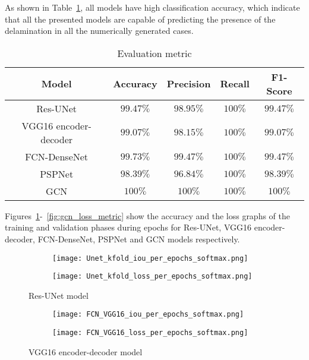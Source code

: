 As shown in Table~\ref{tab:evaluation_metric}, all models have high classification accuracy, which indicate that all the presented models are capable of predicting the presence of the delamination in all the numerically generated cases. 
\begin{table}[]
	\centering
	\caption{Evaluation metric}
	\label{tab:evaluation_metric}
	\resizebox{\textwidth}{!}
	{
		\begin{tabular}{ccccc} \hline
			Model& Accuracy & Precision & Recall & F1-Score \\ \hline
			Res-UNet & \(99.47\%\)  & \(98.95\%\) &  \(100\%\)  & \(99.47\%\)  \\ 
			VGG16 encoder-decoder & \(99.07\%\)  & \(98.15\%\) & \(100\%\) &  \(99.07\%\)\\ 
			FCN-DenseNet & \(99.73\%\)  & \(99.47\%\) & \(100\%\)  & \(99.47\%\) \\ 
			PSPNet & \(98.39\%\) & \(96.84\%\) & \(100\%\) & \(98.39\%\) \\ 
			GCN & \(100\%\) & \(100\%\) & \(100\%\) & \(100\%\) \\ \hline
		\end{tabular}
	}
\end{table}
Figures~\ref{fig:unet_accuracy_metric}-~\ref{fig:gcn_loss_metric} show the accuracy and the loss graphs of the training and validation phases during epochs for Res-UNet, VGG16 encoder-decoder, FCN-DenseNet, PSPNet and GCN models respectively.
\begin{figure} [!h]
	\centering
	\begin{subfigure}[b]{0.47\textwidth}
	 \centering		\texttt{[image: Unet\_kfold\_iou\_per\_epochs\_softmax.png]}	\caption{}
	 \label{fig:unet_accuracy_metric}
	\end{subfigure}
	\hfill	
	\begin{subfigure}[b]{0.47\textwidth}
	 \centering
	 \texttt{[image: Unet\_kfold\_loss\_per\_epochs\_softmax.png]}
	 \caption{}
	 \label{fig:unet_loss_metric}
	\end{subfigure}
	\caption{Res-UNet model}
	\label{fig:res_unet_iou_loss}
\end{figure}
\begin{figure}[!h]
	\centering
	\begin{subfigure}[b]{0.47\textwidth}
		\centering
		\texttt{[image: FCN\_VGG16\_iou\_per\_epochs\_softmax.png]}
		\caption{}
		\label{fig:vgg16_accuracy_metric}
	\end{subfigure}		
	\hfill
	\begin{subfigure}[b]{0.47\textwidth}
		\centering
		\texttt{[image: FCN\_VGG16\_loss\_per\_epochs\_softmax.png]}
		\caption{}
		\label{fig:vgg16_loss_metric}
	\end{subfigure}
	\caption{VGG16 encoder-decoder model}
	\label{fig:Vgg16_iou_loss}
\end{figure}
